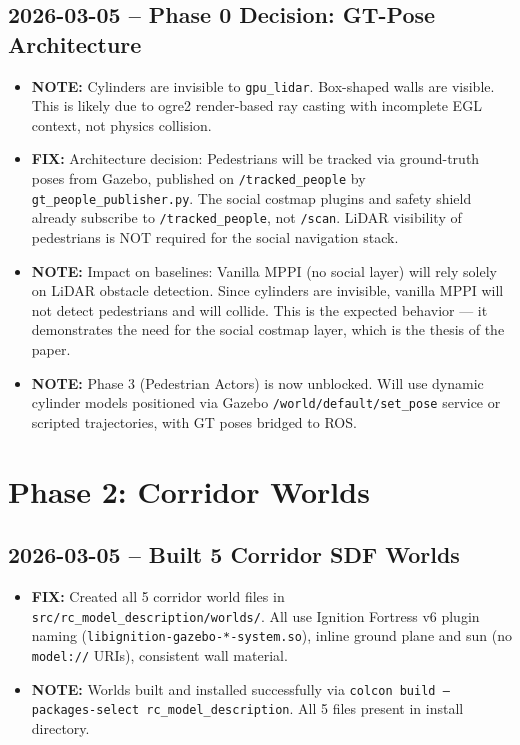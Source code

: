 \documentclass[11pt]{article}
\newcommand{\logentry}[1]{\subsection*{#1}}
\newcommand{\fix}[1]{\textcolor{fixgreen}{\textbf{FIX:} #1}}
\newcommand{\note}[1]{\textcolor{notblue}{\textbf{NOTE:} #1}}
\begin{document}
\logentry{2026-03-05 -- Phase 0 Decision: GT-Pose Architecture}
\begin{itemize}
  \item \note{Cylinders are invisible to \texttt{gpu\_lidar}. Box-shaped walls are visible. This is likely due to ogre2 render-based ray casting with incomplete EGL context, not physics collision.}
  \item \fix{Architecture decision: Pedestrians will be tracked via ground-truth poses from Gazebo, published on \texttt{/tracked\_people} by \texttt{gt\_people\_publisher.py}. The social costmap plugins and safety shield already subscribe to \texttt{/tracked\_people}, not \texttt{/scan}. LiDAR visibility of pedestrians is NOT required for the social navigation stack.}
  \item \note{Impact on baselines: Vanilla MPPI (no social layer) will rely solely on LiDAR obstacle detection. Since cylinders are invisible, vanilla MPPI will not detect pedestrians and will collide. This is the expected behavior --- it demonstrates the need for the social costmap layer, which is the thesis of the paper.}
  \item \note{Phase 3 (Pedestrian Actors) is now unblocked. Will use dynamic cylinder models positioned via Gazebo \texttt{/world/default/set\_pose} service or scripted trajectories, with GT poses bridged to ROS.}
\end{itemize}

\newpage
\section{Phase 2: Corridor Worlds}

\logentry{2026-03-05 -- Built 5 Corridor SDF Worlds}
\begin{itemize}
  \item \fix{Created all 5 corridor world files in \texttt{src/rc\_model\_description/worlds/}. All use Ignition Fortress v6 plugin naming (\texttt{libignition-gazebo-*-system.so}), inline ground plane and sun (no \texttt{model://} URIs), consistent wall material.}
  \item \note{Worlds built and installed successfully via \texttt{colcon build --packages-select rc\_model\_description}. All 5 files present in install directory.}
\end{itemize}
\end{document}
